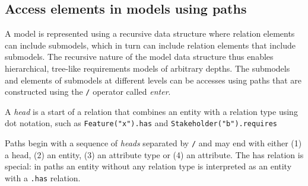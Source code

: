 \documentclass[11pt]{article}
\begin{document}
\subsection{Access elements in models using paths}

A model is represented using a recursive data structure where relation elements can include submodels, which in turn can include relation elements that include submodels. The recursive nature of the model data structure thus enables hierarchical, tree-like requirements models of arbitrary depths. The submodels and elements of submodels at different levels can be accesses using paths that are constructed using the \verb+/+ operator called {\it enter}. 

A {\it head} is a start of a relation that combines an entity with a relation type using dot notation, such as  
\verb+Feature("x").has+ and \verb+Stakeholder("b").requires+  

Paths begin with a sequence of {\it heads} separated by \verb+/+ and may end with either (1) a head, (2) an entity, (3) an attribute type or (4) an attribute. The has relation is special: in paths an entity without any relation type is interpreted as an entity with a \verb+.has+ relation. 
\end{document}
